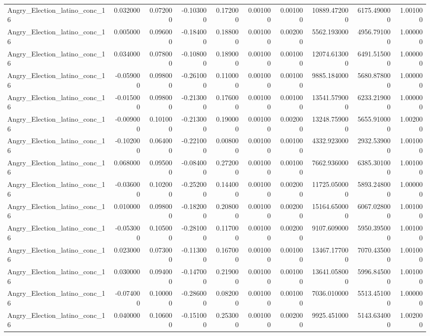 \begin{table}
\begin{tabular}{lrrrrrrrrr}
Angry_Election_latino_conc_16 & 0.032000 & 0.072000 & -0.103000 & 0.172000 & 0.001000 & 0.001000 & 10889.472000 & 6175.490000 & 1.001000 \\
Angry_Election_latino_conc_16 & 0.005000 & 0.096000 & -0.184000 & 0.188000 & 0.001000 & 0.002000 & 5562.193000 & 4956.791000 & 1.000000 \\
Angry_Election_latino_conc_16 & 0.034000 & 0.078000 & -0.108000 & 0.189000 & 0.001000 & 0.001000 & 12074.613000 & 6491.515000 & 1.000000 \\
Angry_Election_latino_conc_16 & -0.059000 & 0.098000 & -0.261000 & 0.110000 & 0.001000 & 0.001000 & 9885.184000 & 5680.878000 & 1.000000 \\
Angry_Election_latino_conc_16 & -0.015000 & 0.098000 & -0.213000 & 0.176000 & 0.001000 & 0.001000 & 13541.579000 & 6233.219000 & 1.000000 \\
Angry_Election_latino_conc_16 & -0.009000 & 0.101000 & -0.213000 & 0.190000 & 0.001000 & 0.002000 & 13248.759000 & 5655.910000 & 1.002000 \\
Angry_Election_latino_conc_16 & -0.102000 & 0.064000 & -0.221000 & 0.008000 & 0.001000 & 0.001000 & 4332.923000 & 2932.539000 & 1.001000 \\
Angry_Election_latino_conc_16 & 0.068000 & 0.095000 & -0.084000 & 0.272000 & 0.001000 & 0.001000 & 7662.936000 & 6385.301000 & 1.001000 \\
Angry_Election_latino_conc_16 & -0.036000 & 0.102000 & -0.252000 & 0.144000 & 0.001000 & 0.002000 & 11725.050000 & 5893.248000 & 1.000000 \\
Angry_Election_latino_conc_16 & 0.010000 & 0.098000 & -0.182000 & 0.208000 & 0.001000 & 0.002000 & 15164.650000 & 6067.028000 & 1.001000 \\
Angry_Election_latino_conc_16 & -0.053000 & 0.105000 & -0.281000 & 0.117000 & 0.001000 & 0.002000 & 9107.609000 & 5950.395000 & 1.001000 \\
Angry_Election_latino_conc_16 & 0.023000 & 0.073000 & -0.113000 & 0.167000 & 0.001000 & 0.001000 & 13467.177000 & 7070.435000 & 1.001000 \\
Angry_Election_latino_conc_16 & 0.030000 & 0.094000 & -0.147000 & 0.219000 & 0.001000 & 0.001000 & 13641.058000 & 5996.845000 & 1.001000 \\
Angry_Election_latino_conc_16 & -0.074000 & 0.100000 & -0.286000 & 0.082000 & 0.001000 & 0.001000 & 7036.010000 & 5513.451000 & 1.000000 \\
Angry_Election_latino_conc_16 & 0.040000 & 0.106000 & -0.151000 & 0.253000 & 0.001000 & 0.002000 & 9925.451000 & 5143.634000 & 1.002000 \\

\end{tabular}
\end{table}
